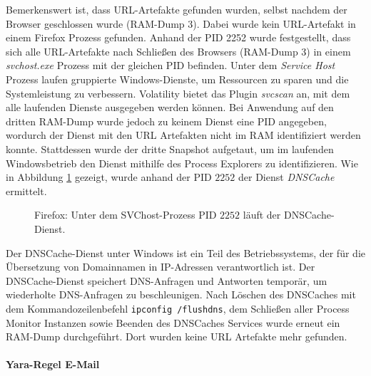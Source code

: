 Bemerkenswert ist, dass URL-Artefakte gefunden wurden, selbst nachdem der Browser geschlossen wurde (RAM-Dump 3). Dabei wurde kein URL-Artefakt in einem Firefox Prozess gefunden.
Anhand der PID 2252 wurde festgestellt, dass sich alle URL-Artefakte nach Schließen des Browsers (RAM-Dump 3) in einem \textit{svchost.exe} Prozess mit der gleichen PID befinden. Unter dem \textit{Service Host} Prozess laufen gruppierte Windows-Dienste, um Ressourcen zu sparen und die Systemleistung zu verbessern.
Volatility bietet das Plugin \textit{svcscan} an, mit dem alle laufenden Dienste ausgegeben werden können.
Bei Anwendung auf den dritten RAM-Dump wurde jedoch zu keinem Dienst eine PID angegeben, wordurch der Dienst mit den URL Artefakten nicht im RAM identifiziert werden konnte. \cite{Nicholasswhite.05.06.2023}
Stattdessen wurde der dritte Snapshot aufgetaut, um im laufenden Windowsbetrieb den Dienst mithilfe des Process Explorers zu identifizieren.
Wie in Abbildung \ref{chart:svchost-dnscache} gezeigt, wurde anhand der PID $2252$ der Dienst \textit{DNSCache} ermittelt.
\begin{figure}[h!]
	\centerline{}
	\caption{Firefox: Unter dem SVChost-Prozess PID $2252$ läuft der DNSCache-Dienst.}
	\label{chart:svchost-dnscache}  
\end{figure}
Der DNSCache-Dienst unter Windows ist ein Teil des Betriebssystems, der für die Übersetzung von Domainnamen in IP-Adressen verantwortlich ist. Der DNSCache-Dienst speichert DNS-Anfragen und Antworten temporär, um wiederholte DNS-Anfragen zu beschleunigen. \cite{MicrosoftLearn.05.06.2023}
Nach Löschen des DNSCaches mit dem Kommandozeilenbefehl \texttt{ipconfig /flushdns}, dem Schließen aller Process Monitor Instanzen sowie Beenden des DNSCaches Services wurde erneut ein RAM-Dump durchgeführt. Dort wurden keine URL Artefakte mehr gefunden.

\paragraph*{Yara-Regel \glqq{}E-Mail\grqq{}}

